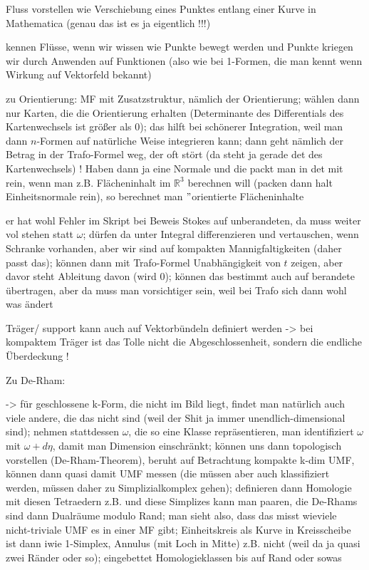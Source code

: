 Fluss vorstellen wie Verschiebung eines Punktes entlang einer Kurve in Mathematica (genau das ist es ja eigentlich !!!)

kennen Flüsse, wenn wir wissen wie Punkte bewegt werden und Punkte kriegen wir durch Anwenden auf Funktionen (also wie bei 1-Formen, die man kennt wenn Wirkung auf Vektorfeld bekannt)


zu Orientierung: MF mit Zusatzstruktur, nämlich der Orientierung; wählen dann nur Karten, die die Orientierung erhalten (Determinante des Differentials des Kartenwechsels ist größer als 0); das hilft bei schönerer Integration, weil man dann $n$-Formen auf natürliche Weise integrieren kann; dann geht nämlich der Betrag in der Trafo-Formel weg, der oft stört (da steht ja gerade det des Kartenwechsels) ! Haben dann ja eine Normale und die packt man in det mit rein, wenn man z.B. Flächeninhalt im $\mathbb{R}^3$ berechnen will (packen dann halt Einheitsnormale rein), so berechnet man $"$orientierte Flächeninhalte

er hat wohl Fehler im Skript bei Beweis Stokes auf unberandeten, da muss weiter vol stehen statt $\omega$; dürfen da unter Integral differenzieren und vertauschen, wenn Schranke vorhanden, aber wir sind auf kompakten Mannigfaltigkeiten (daher passt das); können dann mit Trafo-Formel Unabhängigkeit von $t$ zeigen, aber davor steht Ableitung davon (wird 0); können das bestimmt auch auf berandete übertragen, aber da muss man vorsichtiger sein, weil bei Trafo sich dann wohl was ändert


Träger/ support kann auch auf Vektorbündeln definiert werden -> bei kompaktem Träger ist das Tolle nicht die Abgeschlossenheit, sondern die endliche Überdeckung !



Zu De-Rham:

-> für geschlossene k-Form, die nicht im Bild liegt, findet man natürlich auch viele andere, die das nicht sind (weil der Shit ja immer unendlich-dimensional sind); nehmen stattdessen $\omega$, die so eine Klasse repräsentieren, man identifiziert $\omega$ mit $\omega + d\eta$, damit man Dimension einschränkt; können uns dann topologisch vorstellen (De-Rham-Theorem), beruht auf Betrachtung kompakte k-dim UMF, können dann quasi damit UMF messen (die müssen aber auch klassifiziert werden, müssen daher zu Simplizialkomplex gehen); definieren dann Homologie mit diesen Tetraedern z.B. und diese Simplizes kann man paaren, die De-Rhams sind dann Dualräume modulo Rand; man sieht also, dass das misst wieviele nicht-triviale UMF es in einer MF gibt; Einheitskreis als Kurve in Kreisscheibe ist dann iwie 1-Simplex, Annulus (mit Loch in Mitte) z.B. nicht (weil da ja quasi zwei Ränder oder so); eingebettet Homologieklassen bis auf Rand oder sowas

